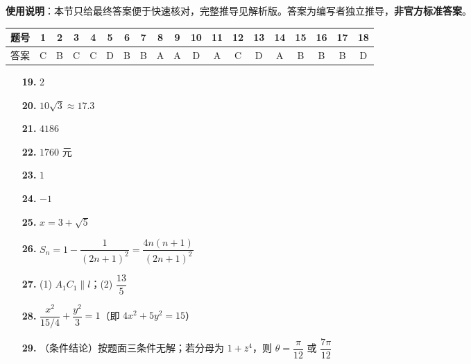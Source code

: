 
\begin{gknotice}
\textbf{使用说明}：本节只给最终答案便于快速核对，完整推导见解析版。答案为编写者独立推导，\textbf{非官方标准答案}。
\end{gknotice}

\begin{center}\begin{tabular}{ccccccccccccccccccc}
\toprule
题号 & 1 & 2 & 3 & 4 & 5 & 6 & 7 & 8 & 9 & 10 & 11 & 12 & 13 & 14 & 15 & 16 & 17 & 18 \\
\midrule
答案 & C & B & C & C & D & B & B & A & A & D & A & C & D & A & B & B & B & D \\
\bottomrule
\end{tabular}\end{center}

\begin{itemize}[leftmargin=2.6em]
  \item[\textbf{19.}] \(2\)
  \item[\textbf{20.}] \(10\sqrt3\approx17.3\)
  \item[\textbf{21.}] \(4186\)
  \item[\textbf{22.}] \(1760\) 元
  \item[\textbf{23.}] \(1\)
  \item[\textbf{24.}] \(-1\)
\end{itemize}

\begin{itemize}[leftmargin=2.6em]
  \item[\textbf{25.}] \(x=3+\sqrt5\)
  \item[\textbf{26.}] \(S_n=1-\dfrac{1}{(2n+1)^2}=\dfrac{4n(n+1)}{(2n+1)^2}\)
  \item[\textbf{27.}] (1) \(A_1C_1\parallel l\)；(2) \(\dfrac{13}{5}\)
  \item[\textbf{28.}] \(\dfrac{x^2}{15/4}+\dfrac{y^2}{3}=1\)（即 \(4x^2+5y^2=15\)）
  \item[\textbf{29.}] （条件结论）按题面三条件无解；若分母为 \(1+\overline z^4\)，则 \(\theta=\dfrac{\pi}{12}\) 或 \(\dfrac{7\pi}{12}\)
\end{itemize}
